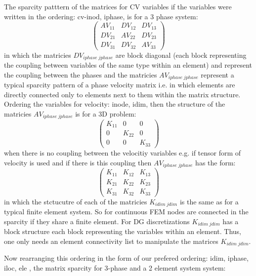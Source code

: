 The sparcity patttern of the matrices for CV variables if the variables were written
in the ordering: cv-inod, iphase, is for a 3 phase system:
\begin{equation}
  \begin{pmatrix}
AV_{11}  &  DV_{12}  &  DV_{13} \\
DV_{21}  &  AV_{22}  &  DV_{23} \\
DV_{31}  &  DV_{32}  &  AV_{33}
  \end{pmatrix}
\label{Vel-mat-spar}
\end{equation}
in which the matricies $DV_{iphase\; jphase}$ are block diagonal (each block representing
the coupling between variables of the same type within an element) and represent the
coupling between the phases and the matricies $AV_{iphase\; jphase}$ represent
a typical sparcity pattern of a phase velocity matrix i.e. in which elements are
directly connected only to elements next to them within the matrix structure.
Ordering the variables for velocity: inode, idim, then the structure of the matricies $AV_{iphase\; jphase}$ is
for a 3D problem:
\begin{equation}
  \begin{pmatrix}
K_{11}  &  0  &  0 \\
0 &  K_{22}  &  0 \\
0  &  0  &  K_{33}
  \end{pmatrix}
\label{Vel-1phase-mat-spar}
\end{equation}
when there is no coupling between the velocitiy variables e.g. if tensor form of velocity is used and
if there is this coupling then  $AV_{iphase\;jphase}$ has the form:
\begin{equation}
  \begin{pmatrix}
K_{11}  &  K_{12}  &  K_{13} \\
K_{21}  &  K_{22}  &  K_{23} \\
K_{31}  &  K_{32}  &  K_{33}
  \end{pmatrix}
\label{Vel-1phase-stress-mat-spar}
\end{equation}
in which the stctucutre of each of the matricies $K_{idim\; jdim}$ is the same as
for a typical finite element system. So for continuous FEM nodes are connected in the sparcity
if they share a finite element. For DG discretizations $K_{idim\; jdim}$ has a block structure
each block representing the variables within an element. Thus, one only needs an element connectivity
list to manipulate the matrices $K_{idim\; jdim}$.


Now rearranging this ordering in the form of our prefered ordering: idim, iphase, iloc, ele
,
the matrix sparcity for 3-phase and a 2 element system system:


